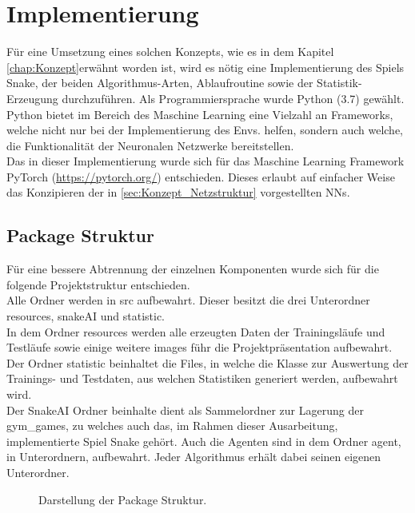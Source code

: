 \chapter{Implementierung} \label{chap:Implementierung}
\graphicspath{{Abbildungen/Implementierung/}}
Für eine Umsetzung eines solchen Konzepts, wie es in dem Kapitel \ref{chap:Konzept}erwähnt worden ist, wird es nötig eine Implementierung des Spiels Snake, der beiden Algorithmus-Arten, Ablaufroutine sowie der Statistik-Erzeugung durchzuführen. Als Programmiersprache wurde Python (3.7) gewählt.\\
Python bietet im Bereich des Maschine Learning eine Vielzahl an Frameworks, welche nicht nur bei der Implementierung des Envs. helfen, sondern auch welche, die Funktionalität der Neuronalen Netzwerke bereitstellen.\\
Das in dieser Implementierung wurde sich für das Maschine Learning Framework PyTorch (\url{https://pytorch.org/}) entschieden. Dieses erlaubt auf einfacher Weise das Konzipieren der in \ref{sec:Konzept_Netzstruktur} vorgestellten NNs.

\section{Package Struktur}
Für eine bessere Abtrennung der einzelnen Komponenten wurde sich für die folgende Projektstruktur entschieden. 
\\Alle Ordner werden in src aufbewahrt. Dieser besitzt die drei Unterordner resources, snakeAI und statistic.\\
In dem Ordner resources werden alle erzeugten Daten der Trainingsläufe und Testläufe sowie einige weitere images führ die Projektpräsentation aufbewahrt.\\
Der Ordner statistic beinhaltet die Files, in welche die Klasse zur Auswertung der Trainings- und Testdaten, aus welchen Statistiken generiert werden, aufbewahrt wird.\\
Der SnakeAI Ordner beinhalte dient als Sammelordner zur Lagerung der gym\_games, zu welches auch das, im Rahmen dieser Ausarbeitung, implementierte Spiel Snake gehört. Auch die Agenten sind in dem Ordner agent, in Unterordnern, aufbewahrt. Jeder Algorithmus erhält dabei seinen eigenen Unterordner.
\begin{figure}[H]
	\centering
	\def\svgscale{0.1}
	
	\caption[Package Struktur]{Darstellung der Package Struktur.}
	\label{fig:Package_Struktur}
\end{figure}


